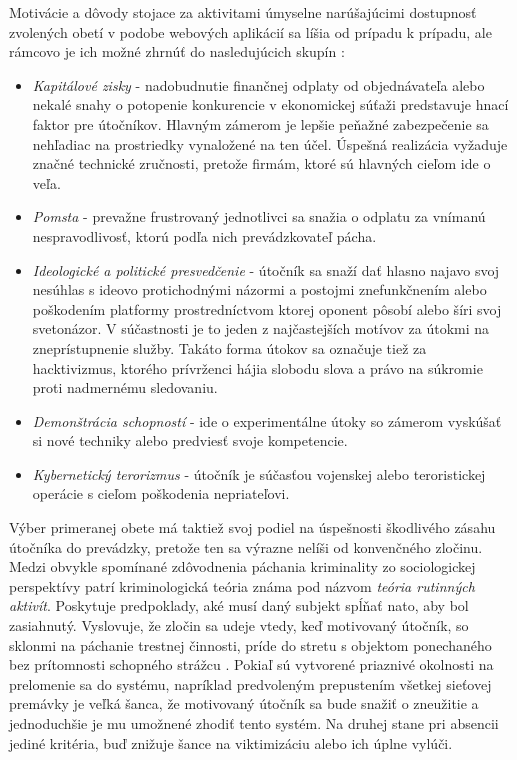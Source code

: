 \documentclass[12pt, a4paper]{article}
\begin{document}
Motivácie a dôvody stojace za aktivitami úmyselne narúšajúcimi dostupnosť zvolených obetí v podobe
webových aplikácií sa líšia od prípadu k prípadu, ale rámcovo je ich možné zhrnúť do nasledujúcich
skupín \cite{why-attack} \cite{ddos-attacks}:
\begin{itemize}
\itemsep0em 
\item \emph{Kapitálové zisky} - nadobudnutie finančnej odplaty od objednávateľa alebo nekalé snahy o 
potopenie konkurencie v ekonomickej súťaži predstavuje hnací faktor pre útočníkov. Hlavným zámerom je
lepšie peňažné zabezpečenie sa nehľadiac na prostriedky vynaložené na ten účel. Úspešná realizácia vyžaduje 
značné technické zručnosti, pretože firmám, ktoré sú hlavných cieľom ide o veľa.
\item \emph{Pomsta} - prevažne frustrovaný jednotlivci sa snažia o odplatu za vnímanú nespravodlivosť, 
ktorú podľa nich prevádzkovateľ pácha.
\item \emph{Ideologické a politické presvedčenie} - útočník sa snaží dať hlasno najavo svoj nesúhlas s 
ideovo protichodnými názormi a postojmi znefunkčnením alebo poškodením platformy prostredníctvom ktorej 
oponent pôsobí alebo šíri svoj svetonázor. V súčastnosti je to jeden z najčastejších motívov za útokmi na 
zneprístupnenie služby. Takáto forma útokov sa označuje tiež za hacktivizmus, ktorého prívrženci hájia 
slobodu slova a právo na súkromie proti nadmernému sledovaniu. 
\item \emph{Demonštrácia schopností} - ide o experimentálne útoky so zámerom vyskúšať si nové techniky
alebo predviesť svoje kompetencie. 
\item\emph{Kybernetický terorizmus} - útočník je súčasťou vojenskej alebo teroristickej operácie s cieľom
poškodenia nepriateľovi.
\end{itemize} 

Výber primeranej obete má taktiež svoj podiel na úspešnosti škodlivého zásahu útočníka do prevádzky,
pretože ten sa výrazne nelíši od konvenčného zločinu. Medzi obvykle spomínané zdôvodnenia páchania 
kriminality zo sociologickej perspektívy patrí kriminologická teória známa pod názvom 
\emph{teória rutinných aktivít}. Poskytuje predpoklady, aké  musí daný subjekt spĺňať nato, aby bol 
zasiahnutý. Vyslovuje, že zločin sa udeje vtedy, keď motivovaný útočník, so sklonmi na páchanie trestnej 
činnosti, príde do stretu s objektom ponechaného bez prítomnosti schopného strážcu \cite{cohen-felson}.
Pokiaľ sú vytvorené priaznivé okolnosti na prelomenie sa do systému, napríklad predvoleným prepustením všetkej sieťovej premávky je veľká šanca, že motivovaný útočník sa bude snažiť o zneužitie a jednoduchšie
je mu umožnené zhodiť tento systém. Na druhej stane pri absencii jediné kritéria, buď znižuje šance na
viktimizáciu alebo ich úplne vylúči.
\end{document}
